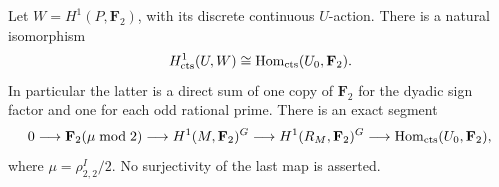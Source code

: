 \begin{proposition}
\label{prop:explicit-residual-extension-obstruction}
Let \(W=H^1(P,\mathbf F_2)\), with its discrete continuous
\(U\)-action. There is a natural isomorphism
\begin{equation}
 H^1_{\rm cts}(U,W)
   \cong\operatorname{Hom}_{\rm cts}(U_0,\mathbf F_2).    \label{eq:cyclotomic-frattini-2}
\end{equation}
In particular the latter is a direct sum of one copy of
\(\mathbf F_2\) for the dyadic sign factor and one for each
odd rational prime.
There is an exact segment
\begin{equation}
 0\longrightarrow\mathbf F_2(\mu\bmod2)
 \longrightarrow H^1(M,\mathbf F_2)^G
 \longrightarrow H^1(R_M,\mathbf F_2)^G
 \longrightarrow
       \operatorname{Hom}_{\rm cts}(U_0,\mathbf F_2),     \label{eq:cyclotomic-frattini-3}
\end{equation}
where \(\mu=\rho_{2,2}^I/2\).
No surjectivity of the last map is asserted.
\end{proposition}

